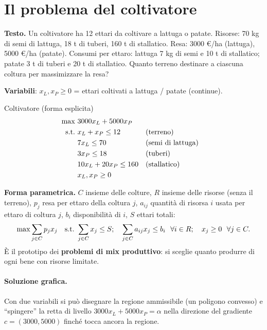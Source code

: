 \section{Il problema del coltivatore}\label{sec:colt}

\textbf{Testo.} Un coltivatore ha 12 ettari da coltivare a lattuga o patate. Risorse: 70 kg di semi di lattuga, 18 t di tuberi, 160 t di stallatico. Resa: 3000 \euro/ha (lattuga), 5000 \euro/ha (patate). Consumi per ettaro: lattuga 7 kg di semi e 10 t di stallatico; patate 3 t di tuberi e 20 t di stallatico. Quanto terreno destinare a ciascuna coltura per massimizzare la resa?


\textbf{Variabili}: $x_L,x_P\ge 0$ = ettari coltivati a lattuga / patate (continue).
\begin{modello}{Coltivatore (forma esplicita)}
\begin{align*}
\max\ & 3000x_L+5000x_P\\
\text{s.t.}\ & x_L+x_P\le 12 &&\text{(terreno)}\\
& 7x_L\le 70 &&\text{(semi di lattuga)}\\
& 3x_P\le 18 &&\text{(tuberi)}\\
& 10x_L+20x_P\le 160 &&\text{(stallatico)}\\
& x_L,x_P\ge 0
\end{align*}
\end{modello}

\textbf{Forma parametrica.} $C$ insieme delle colture, $R$ insieme delle risorse (senza il terreno), $p_j$ resa per ettaro della coltura $j$, $a_{ij}$ quantità di risorsa $i$ usata per ettaro di coltura $j$, $b_i$ disponibilità di $i$, $S$ ettari totali:
\[
\max \sum_{j\in C}p_jx_j\quad \text{s.t.}\ \sum_{j\in C}x_j\le S;\quad \sum_{j\in C}a_{ij}x_j\le b_i\ \ \forall i\in R;\quad x_j\ge0\ \ \forall j\in C.
\]
È il prototipo dei \textbf{problemi di mix produttivo}: si sceglie quanto produrre di ogni bene con risorse limitate.

\paragraph{Soluzione grafica.} Con due variabili si può disegnare la regione ammissibile (un poligono convesso) e ``spingere'' la retta di livello $3000x_L+5000x_P=\alpha$ nella direzione del gradiente $c=(3000,5000)$ finché tocca ancora la regione.

